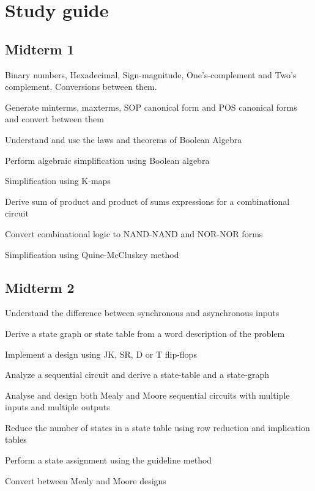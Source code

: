 \documentclass[options]{article}
\newcommand{\cmark}{\ding{51}}%
\newcommand{\done}{\rlap{$\square$}{\raisebox{2pt}{\large\hspace{1pt}\cmark}}%
  \hspace{-2.5pt}}
\begin{document}
\section{Study guide}
\subsection{Midterm 1}
\begin{todolist}
  \item[\done] Binary numbers, Hexadecimal, Sign-magnitude, One's-complement and
    Two's complement. Conversions between them.
  \item[\done] Generate minterms, maxterms, SOP canonical form and POS
    canonical forms and convert between them\\
  \item[\done]  Understand and use the laws and theorems of Boolean Algebra
  \item[\done]  Perform algebraic simplification using Boolean algebra
  \item[\done]  Simplification using K-maps
  \item[\done]  Derive sum of product and product of sums expressions for a combinational circuit
  \item[\done]  Convert combinational logic to NAND-NAND and NOR-NOR forms
  \item[\done]  Simplification using Quine-McCluskey method
\end{todolist}

\subsection{Midterm 2}
\begin{todolist}
  \item[\done] Understand the difference between synchronous and asynchronous inputs
  \item[\done] Derive a state graph or state table from a word description of the problem
  \item[\done] Implement a design using JK, SR, D or T flip-flops
  \item[\done] Analyze a sequential circuit and derive a state-table and a state-graph
  \item[\done] Analyse and design both Mealy and Moore sequential circuits with multiple inputs and multiple outputs
  \item Reduce the number of states in a state table using row reduction and implication tables
  \item Perform a state assignment using the guideline method
  \item Convert between Mealy and Moore designs
\end{todolist}
\end{document}
